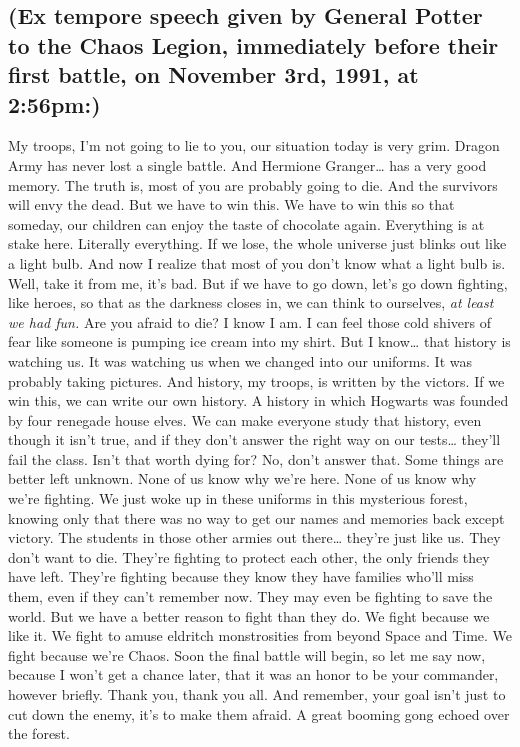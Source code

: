 \subsection{(Ex tempore speech given by General Potter to the Chaos Legion,
immediately before their first battle, on November 3rd, 1991, at 2:56pm:)}

My troops, I'm not going to lie to you, our situation today is very grim.
Dragon Army has never lost a single battle. And Hermione Granger{\ldots} has a
very good memory. The truth is, most of you are probably going to die. And the
survivors will envy the dead. But we have to win this. We have to win this so
that someday, our children can enjoy the taste of chocolate again. Everything
is at stake here. Literally everything. If we lose, the whole universe just
blinks out like a light bulb. And now I realize that most of you don't know
what a light bulb is. Well, take it from me, it's bad. But if we have to go
down, let's go down fighting, like heroes, so that as the darkness closes in,
we can think to ourselves, \emph{at least we had fun.} Are you afraid to die? I
know I am. I can feel those cold shivers of fear like someone is pumping ice
cream into my shirt. But I know{\ldots} that history is watching us. It was
watching us when we changed into our uniforms. It was probably taking pictures.
And history, my troops, is written by the victors. If we win this, we can write
our own history. A history in which Hogwarts was founded by four renegade house
elves. We can make everyone study that history, even though it isn't true, and
if they don't answer the right way on our tests{\ldots} they'll fail the class.
Isn't that worth dying for? No, don't answer that. Some things are better left
unknown. None of us know why we're here. None of us know why we're fighting. We
just woke up in these uniforms in this mysterious forest, knowing only that
there was no way to get our names and memories back except victory. The
students in those other armies out there{\ldots} they're just like us. They
don't want to die. They're fighting to protect each other, the only friends
they have left. They're fighting because they know they have families who'll
miss them, even if they can't remember now. They may even be fighting to save
the world. But we have a better reason to fight than they do. We fight because
we like it. We fight to amuse eldritch monstrosities from beyond Space and
Time. We fight because we're Chaos. Soon the final battle will begin, so let me
say now, because I won't get a chance later, that it was an honor to be your
commander, however briefly. Thank you, thank you all. And remember, your goal
isn't just to cut down the enemy, it's to make them afraid.
\sbreak
A great booming gong echoed over the forest.

